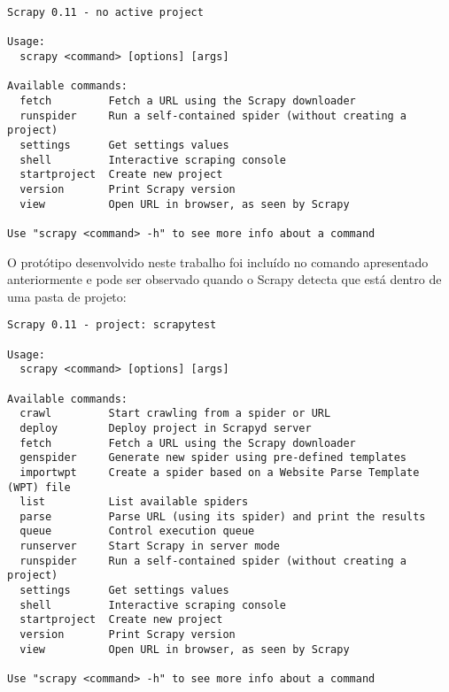 \begin{lstlisting}
Scrapy 0.11 - no active project

Usage:
  scrapy <command> [options] [args]

Available commands:
  fetch         Fetch a URL using the Scrapy downloader
  runspider     Run a self-contained spider (without creating a project)
  settings      Get settings values
  shell         Interactive scraping console
  startproject  Create new project
  version       Print Scrapy version
  view          Open URL in browser, as seen by Scrapy

Use "scrapy <command> -h" to see more info about a command
\end{lstlisting}

O protótipo desenvolvido neste trabalho foi incluído no comando apresentado anteriormente e pode ser observado quando o Scrapy detecta que está dentro de uma pasta de projeto:

\pagebreak
{}
\begin{lstlisting}
Scrapy 0.11 - project: scrapytest

Usage:
  scrapy <command> [options] [args]

Available commands:
  crawl         Start crawling from a spider or URL
  deploy        Deploy project in Scrapyd server
  fetch         Fetch a URL using the Scrapy downloader
  genspider     Generate new spider using pre-defined templates
  importwpt     Create a spider based on a Website Parse Template (WPT) file
  list          List available spiders
  parse         Parse URL (using its spider) and print the results
  queue         Control execution queue
  runserver     Start Scrapy in server mode
  runspider     Run a self-contained spider (without creating a project)
  settings      Get settings values
  shell         Interactive scraping console
  startproject  Create new project
  version       Print Scrapy version
  view          Open URL in browser, as seen by Scrapy

Use "scrapy <command> -h" to see more info about a command

\end{lstlisting}